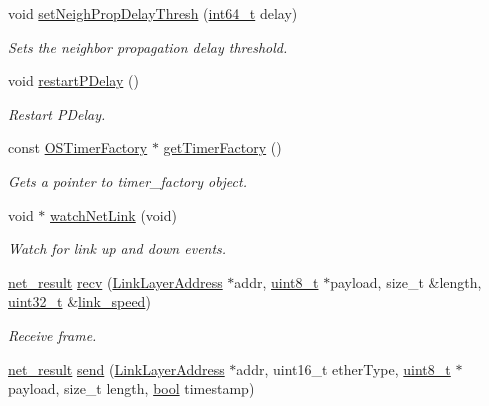 \begin{DoxyCompactItemize}
void \hyperlink{class_common_port_af7e96b880eccf3d6a1bf962a7d2ca296}{set\+Neigh\+Prop\+Delay\+Thresh} (\hyperlink{parse_8c_a67a9885ef4908cb72ce26d75b694386c}{int64\+\_\+t} delay)
\begin{DoxyCompactList}\small\item\em Sets the neighbor propagation delay threshold. \end{DoxyCompactList}\item 
void \hyperlink{class_common_port_a29bef5d949dfdf7cf0a38855eeb2edb9}{restart\+P\+Delay} ()
\begin{DoxyCompactList}\small\item\em Restart P\+Delay. \end{DoxyCompactList}\item 
const \hyperlink{class_o_s_timer_factory}{O\+S\+Timer\+Factory} $\ast$ \hyperlink{class_common_port_ae659108ab426a2d9e8e3c84b63ac6cdc}{get\+Timer\+Factory} ()
\begin{DoxyCompactList}\small\item\em Gets a pointer to timer\+\_\+factory object. \end{DoxyCompactList}\item 
void $\ast$ \hyperlink{class_common_port_a7fc2ad2925376becd473fcfc684472fb}{watch\+Net\+Link} (void)
\begin{DoxyCompactList}\small\item\em Watch for link up and down events. \end{DoxyCompactList}\item 
\hyperlink{avbts__osnet_8hpp_a21b2b4b5e479ef3adfc039ac30c961cd}{net\+\_\+result} \hyperlink{class_common_port_a29eedafc1eb6f2ee041ea519b9a4f3c0}{recv} (\hyperlink{class_link_layer_address}{Link\+Layer\+Address} $\ast$addr, \hyperlink{stdint_8h_aba7bc1797add20fe3efdf37ced1182c5}{uint8\+\_\+t} $\ast$payload, size\+\_\+t \&length, \hyperlink{parse_8c_a6eb1e68cc391dd753bc8ce896dbb8315}{uint32\+\_\+t} \&\hyperlink{class_common_port_aae24fc4f200e75aa8215f797b2561dbf}{link\+\_\+speed})
\begin{DoxyCompactList}\small\item\em Receive frame. \end{DoxyCompactList}\item 
\hyperlink{avbts__osnet_8hpp_a21b2b4b5e479ef3adfc039ac30c961cd}{net\+\_\+result} \hyperlink{class_common_port_a16eac0643a26a66fa2b664d4db5d3e42}{send} (\hyperlink{class_link_layer_address}{Link\+Layer\+Address} $\ast$addr, uint16\+\_\+t ether\+Type, \hyperlink{stdint_8h_aba7bc1797add20fe3efdf37ced1182c5}{uint8\+\_\+t} $\ast$payload, size\+\_\+t length, \hyperlink{avb__gptp_8h_af6a258d8f3ee5206d682d799316314b1}{bool} timestamp)

\end{DoxyCompactItemize}
